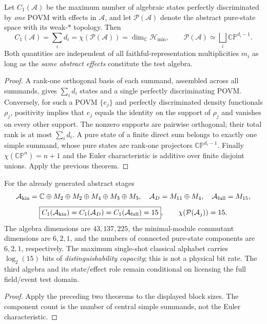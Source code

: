 \documentclass[12pt,a4paper]{article}
\begin{document}
\begin{theorem}
\label{p2b:thm:v352-capacity-euler}
Let $C_1(\mathcal A)$ be the maximum number of algebraic states
perfectly discriminated by \emph{one} POVM with effects in
$\mathcal A$, and let $\mathcal P(\mathcal A)$ denote the abstract
pure-state space with its weak-$*$ topology.  Then
\[
 \boxed{C_1(\mathcal A)=\sum_i d_i
 =\chi(\mathcal P(\mathcal A))
 =\dim_{\mathbb C}\mathcal H_{\min}},\qquad
 \mathcal P(\mathcal A)\simeq\bigsqcup_i\mathbb{CP}^{d_i-1}.
\]
Both quantities are independent of all faithful-representation
multiplicities $m_i$ as long as the \emph{same abstract effects}
constitute the test algebra.
\end{theorem}
\begin{proof}
A rank-one orthogonal basis of each summand, assembled across all
summands, gives $\sum_i d_i$ states and a single perfectly
discriminating POVM.  Conversely, for such a POVM
$\{e_j\}$ and perfectly discriminated density functionals
$\rho_j$, positivity implies that $e_j$ equals the identity on
the support of $\rho_j$ and vanishes on every other support.
The nonzero supports are pairwise orthogonal; their total rank is at
most $\sum_i d_i$.  A pure state of a finite direct sum belongs
to exactly one simple summand, whose pure states are rank-one
projectors $\mathbb{CP}^{d_i-1}$.  Finally
$\chi(\mathbb{CP}^{n})=n+1$ and the Euler characteristic is
additive over finite disjoint unions.  Apply the previous theorem.
\end{proof}

\begin{corollary}
\label{p2b:cor:v352-three-stage-capacity}
For the already generated abstract stages
\[
 \mathcal A_{\rm kin}=\mathbb C\oplus M_2\oplus M_2\oplus
 M_4\oplus M_3\oplus M_3,\quad
 \mathcal A_D=M_{11}\oplus M_4,\quad
 \mathcal A_{\rm full}=M_{15},
\]
\[
 \boxed{C_1(\mathcal A_{\rm kin})=C_1(\mathcal A_D)
  =C_1(\mathcal A_{\rm full})=15},\qquad
 \chi(\mathcal P(\mathcal A_j))=15.
\]
The algebra dimensions are $43,137,225$, the minimal-module
commutant dimensions are $6,2,1$, and the numbers of connected
pure-state components are $6,2,1$, respectively.  The maximum
single-shot classical alphabet carries $\log_2(15)$ bits of
\emph{distinguishability capacity}; this is not a physical bit rate.
The third algebra and its state/effect role remain conditional on
licensing the full field/event test domain.
\end{corollary}
\begin{proof}
Apply the preceding two theorems to the displayed block sizes.
The component count is the number of central simple summands, not
the Euler characteristic.
\end{proof}
\end{document}
